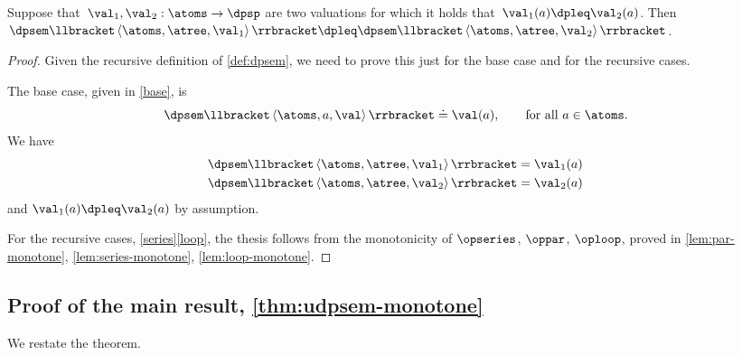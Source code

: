 \begin{lemma}
\label{lem:dpsem-monotone}Suppose that~$\val_{1},\val_{2}:\atoms\rightarrow\dpsp$
are two valuations for which it holds that~$\val_{1}(a)\dpleq\val_{2}(a)$.
Then~$\dpsem\llbracket\left\langle \atoms,\atree,\val_{1}\right\rangle \rrbracket\dpleq\dpsem\llbracket\left\langle \atoms,\atree,\val_{2}\right\rangle \rrbracket$.
\end{lemma}
\begin{proof}
Given the recursive definition of \cref{def:dpsem}, we need
to prove this just for the base case and for the recursive cases.

The base case, given in \eqref{base}, is
\[
\dpsem\llbracket\left\langle \atoms,a,\val\right\rangle \rrbracket\doteq\val(a),\qquad\text{for all}\ a\in\atoms.
\]
We have
\begin{align*}
\dpsem\llbracket\left\langle \atoms,\atree,\val_{1}\right\rangle \rrbracket & =\val_{1}(a)\\
\dpsem\llbracket\left\langle \atoms,\atree,\val_{2}\right\rangle \rrbracket & =\val_{2}(a)
\end{align*}
and $\val_{1}(a)\dpleq\val_{2}(a)$ by assumption.

For the recursive cases, \eqref{series}\textendash \eqref{loop},
the thesis follows from the monotonicity of $\opseries$, $\oppar$,
$\oploop$, proved in \cref{lem:par-monotone}, \cref{lem:series-monotone},
\cref{lem:loop-monotone}.
\end{proof}

\subsection{Proof of the main result, \cref{thm:udpsem-monotone}}

\label{subsec:proof-main-result}

We restate the theorem.

